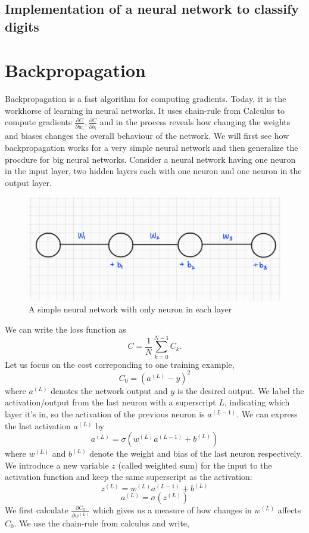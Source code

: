 \subsection{Implementation of a neural network to classify digits}
\section{Backpropagation}
Backpropagation is a fast algorithm for computing gradients. Today, it is the workhorse of learning in neural networks. It uses chain-rule from 
Calculus to compute gradients $\frac{\partial C}{\partial w_i}, \frac{\partial C}{\partial b_i}$ and in the process reveals how changing the weights and 
biases changes the overall behaviour of the network. We will first see how backpropagation works for a very simple neural network and then generalize the procdure for
big neural networks. Consider a neural network having one neuron in the input layer, two hidden layers each with one neuron and one neuron in the output layer. 
\begin{figure}[htbp]
    \centering
    \includegraphics[width=.5\textwidth]{Figures/simpNN.png}
    \caption{A simple neural network with only neuron in each layer}
    \label{fig:sim_NN}
\end{figure} 
We can write the loss function as 
$$C = \frac{1}{N} \sum_{k=0}^{N-1} C_k.$$
Let us focus on the cost correponding to one training example,
$$C_0 = (a^{(L)} - y)^2$$ 
where $a^{(L)}$ denotes the network output and $y$ is the desired output. We label the activation/output from the last neuron with a superscript $L$, indicating which layer it's in, so the
activation of the previous neuron is $a^{(L-1)}$. We can express the last activation $a^{(L)}$ by 
$$a^{(L)} = \sigma (w^{(L)}a^{(L-1)} + b^{(L)})$$
where $w^{(L)}$ and $b^{(L)}$ denote the weight and bias of the last neuron respectively. We introduce a new variable $z$ (called weighted sum) for the input to the activation function and keep the same superscript as the activation:
$$z^{(L)} = w^{(L)} a^{(L-1)} + b^{(L)}$$
$$a^{(L)} = \sigma (z^{(L)}) $$
We first calculate $\frac{\partial C_0}{\partial w^{(L)}}$ which gives us a measure of how changes in $w^{(L)}$ affects $C_0$. We use the chain-rule from calculus and write, 
